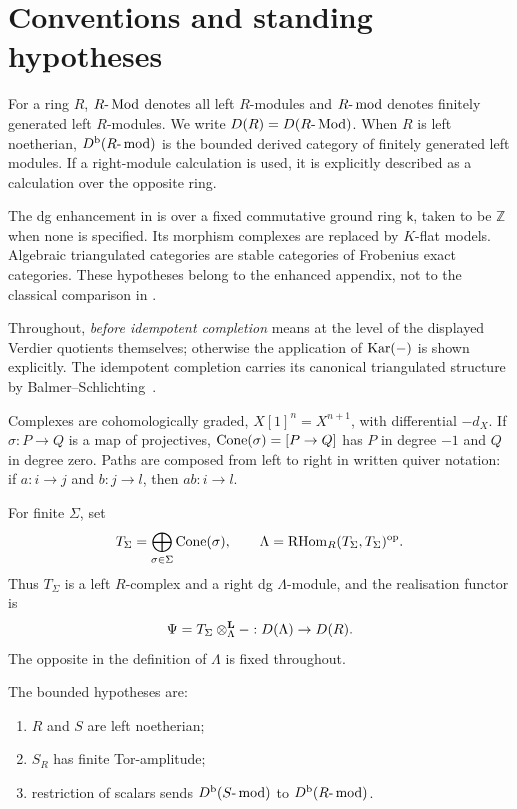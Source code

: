 
\section{Conventions and standing hypotheses}\label{sec:preliminaries}

For a ring \(R\), \(R\text{-}\operatorname{Mod}\) denotes all left \(R\)-modules and \(R\text{-}\operatorname{mod}\) denotes finitely generated left \(R\)-modules.  We write \(D(R)=D(R\text{-}\operatorname{Mod})\).  When \(R\) is left noetherian, \(D^{\mathrm b}(R\text{-}\operatorname{mod})\) is the bounded derived category of finitely generated left modules.  If a right-module calculation is used, it is explicitly described as a calculation over the opposite ring.

The dg enhancement in  is over a fixed commutative ground ring \(\mathsf k\), taken to be \(\mathbb Z\) when none is specified. Its morphism complexes are replaced by \(K\)-flat models. Algebraic triangulated categories are stable categories of Frobenius exact categories. These hypotheses belong to the enhanced appendix, not to the classical comparison in .

Throughout, \emph{before idempotent completion} means at the level of the displayed Verdier quotients themselves; otherwise the application of \(\operatorname{Kar}(-)\) is shown explicitly.  The idempotent completion carries its canonical triangulated structure by Balmer--Schlichting~\cite[Theorem~1.5]{BalmerSchlichting01}.

Complexes are cohomologically graded, \(X[1]^n=X^{n+1}\), with differential \(-d_X\).  If \(\sigma:P\to Q\) is a map of projectives, \(\operatorname{Cone}(\sigma)=[P\to Q]\) has \(P\) in degree \(-1\) and \(Q\) in degree zero.  Paths are composed from left to right in written quiver notation: if \(a:i\to j\) and \(b:j\to l\), then \(ab:i\to l\).

For finite \(\Sigma\), set
\[
 T_\Sigma=\bigoplus_{\sigma\in\Sigma}\operatorname{Cone}(\sigma),\qquad
 \Lambda=\operatorname{RHom}_R(T_\Sigma,T_\Sigma)^{\mathrm{op}}.
\]
Thus \(T_\Sigma\) is a left \(R\)-complex and a right dg \(\Lambda\)-module, and the realisation functor is
\[
 \Psi=T_\Sigma\otimes^{\mathbf L}_\Lambda-:D(\Lambda)\to D(R).
\]
The opposite in the definition of \(\Lambda\) is fixed throughout.

The bounded hypotheses are:
\begin{enumerate}[label=\textup{(B\arabic*)}]
\item \(R\) and \(S\) are left noetherian;
\item \(S_R\) has finite Tor-amplitude;
\item restriction of scalars sends \(D^{\mathrm b}(S\text{-}\operatorname{mod})\) to \(D^{\mathrm b}(R\text{-}\operatorname{mod})\).
\end{enumerate}

